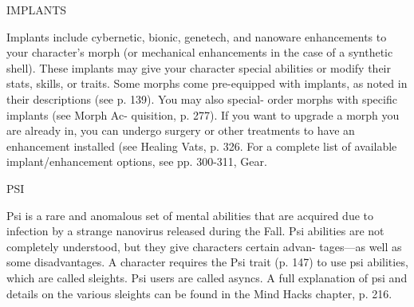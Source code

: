 IMPLANTS

Implants include cybernetic, bionic, genetech, and
nanoware enhancements to your character's morph
(or mechanical enhancements in the case of a synthetic
shell). These implants may give your character special
abilities or modify their stats, skills, or traits. Some
morphs come pre-equipped with implants, as noted in
their descriptions (see p. 139). You may also special-
order morphs with specific implants (see Morph Ac-
quisition, p. 277). If you want to upgrade a morph
you are already in, you can undergo surgery or other
treatments to have an enhancement installed (see
Healing Vats, p. 326. For a complete list of available
implant/enhancement options, see pp. 300-311, Gear.

PSI

Psi is a rare and anomalous set of mental abilities that
are acquired due to infection by a strange nanovirus
released during the Fall. Psi abilities are not completely
understood, but they give characters certain advan-
tages—as well as some disadvantages. A character
requires the Psi trait (p. 147) to use psi abilities, which
are called sleights. Psi users are called asyncs. A full
explanation of psi and details on the various sleights
can be found in the Mind Hacks chapter, p. 216.


